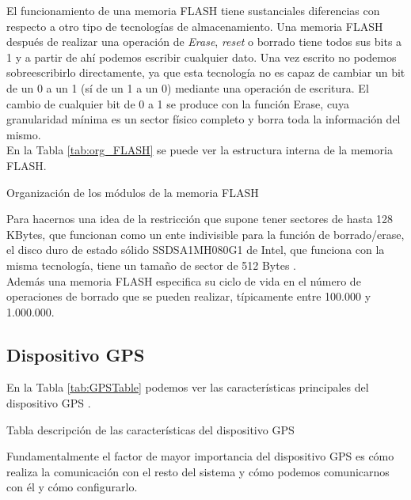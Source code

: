 El funcionamiento de una memoria FLASH tiene sustanciales diferencias con respecto a otro tipo de tecnologías de almacenamiento. Una memoria FLASH después de realizar una operación de \textit{Erase}, \textit{reset} o borrado tiene todos sus bits a 1 y a partir de ahí podemos escribir cualquier dato. Una vez escrito no podemos sobreescribirlo directamente, ya que esta tecnología no es capaz de cambiar un bit de un 0 a un 1 (sí de un 1 a un 0) mediante una operación de escritura. El cambio de cualquier bit de 0 a 1 se produce con la función Erase, cuya granularidad mínima es un sector físico completo y borra toda la información del mismo.\\

En la Tabla \ref{tab:org_FLASH} se puede ver la estructura interna de la memoria FLASH.\\

\begin{table}[h!]
\centering

\caption {Organización de los módulos de la memoria FLASH}
\label{tab:org_FLASH}
\end{table}

Para hacernos una idea de la restricción que supone tener sectores de hasta 128 KBytes, que funcionan como un ente indivisible para la función de borrado/erase, el disco duro de estado sólido SSDSA1MH080G1 de Intel, que funciona con la misma tecnología, tiene un tamaño de sector de 512 Bytes \cite{bib:intelssd}.\\

Además una memoria FLASH especifica su ciclo de vida en el número de operaciones de borrado que se pueden realizar, típicamente entre 100.000 y 1.000.000.\\


\subsection{Dispositivo GPS}
\label{sec:dispGPS}
En la Tabla \ref{tab:GPSTable} podemos ver las características principales del dispositivo GPS \cite{bib:gps}.\\

\begin{table}[h!]
\centering

\caption {Tabla descripción de las características del dispositivo GPS}
\label{tab:GPSTable}
\end{table}

Fundamentalmente el factor de mayor importancia del dispositivo GPS es cómo realiza la comunicación con el resto del sistema y cómo podemos comunicarnos con él y cómo configurarlo.\\

